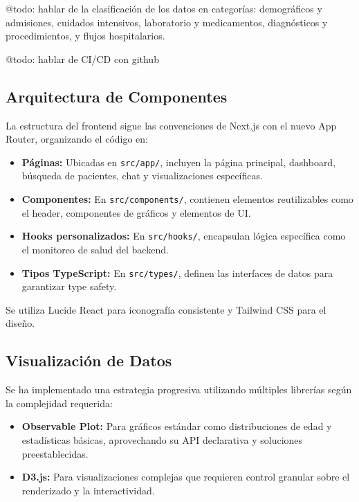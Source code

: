 @todo: hablar de la clasificación de los datos en categorías: demográficos y admisiones, cuidados intensivos, laboratorio y medicamentos, diagnósticos y procedimientos, y flujos hospitalarios.

@todo: hablar de CI/CD con github

\subsection{Arquitectura de Componentes}

La estructura del frontend sigue las convenciones de Next.js con el nuevo App Router, organizando el código en:

\begin{itemize}
\item \textbf{Páginas:} Ubicadas en \texttt{src/app/}, incluyen la página principal, dashboard, búsqueda de pacientes, chat y visualizaciones específicas.
\item \textbf{Componentes:} En \texttt{src/components/}, contienen elementos reutilizables como el header, componentes de gráficos y elementos de UI.
\item \textbf{Hooks personalizados:} En \texttt{src/hooks/}, encapsulan lógica específica como el monitoreo de salud del backend.
\item \textbf{Tipos TypeScript:} En \texttt{src/types/}, definen las interfaces de datos para garantizar type safety.
\end{itemize}

Se utiliza Lucide React para iconografía consistente y Tailwind CSS para el diseño.

\subsection{Visualización de Datos}

Se ha implementado una estrategia progresiva utilizando múltiples librerías según la complejidad requerida:

\begin{itemize}
\item \textbf{Observable Plot:} Para gráficos estándar como distribuciones de edad y estadísticas básicas, aprovechando su API declarativa y soluciones preestablecidas.
\item \textbf{D3.js:} Para visualizaciones complejas que requieren control granular sobre el renderizado y la interactividad.
\end{itemize}

